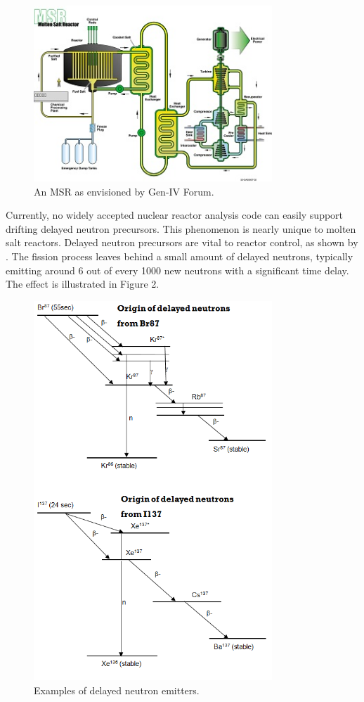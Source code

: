 \documentclass[12pt]{article}
\begin{document}
\begin{figure}
\includegraphics[width=0.8\textwidth]{gifmsr}
\caption{An MSR as envisioned by Gen-IV Forum.}
\label{fig:gifmsr}
\end{figure}

Currently, no widely accepted nuclear reactor analysis code can easily support drifting delayed neutron precursors. This phenomenon is nearly unique to molten salt reactors. Delayed neutron precursors are vital to reactor control, as shown by \cite[Ch. 6]{duderstadt_nuclear_1976}. The fission process leaves behind a small amount of delayed neutrons, typically emitting around 6 out of every 1000 new neutrons with a significant time delay. The effect is illustrated in Figure 2.

\begin{figure}
\includegraphics[width=0.8\textwidth]{dnp}
\caption{Examples of delayed neutron emitters.}
\label{fig:dnps}
\end{figure}
\end{document}
